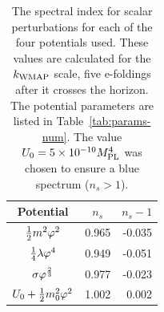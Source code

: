 \begin{table}
\begin{center}
\begin{tabular}{ccr}
\toprule
Potential & $n_s$ & $n_s - 1$ \\
\midrule
$\frac{1}{2} m^2 \varphi^2$ & 0.965 & -0.035 \\ 
$\frac{1}{4}\lambda\varphi^4$ & 0.949 & -0.051 \\
$\sigma\varphi^{\frac{2}{3}}$ & 0.977 & -0.023 \\
$U_0 + \frac{1}{2} m_0^2 \varphi^2$ & 1.002 & 0.002 \\
\bottomrule
\end{tabular}
\caption[Spectral Index Values for the Four Potentials]
{The spectral index for scalar perturbations for each of the four
potentials used. These values are calculated for the $k_\mathrm{WMAP}$ scale, five e-foldings
after it crosses the horizon. The potential parameters are listed in
Table~\ref{tab:params-num}. The value $U_0=5\times 10^{-10}M_{\mathrm{PL}}^{4}$ was chosen to ensure
a blue spectrum ($n_s>1$).
}
\label{table:ns-res}
\end{center}
\end{table}


